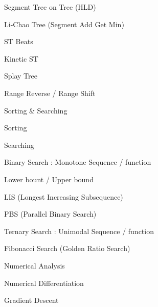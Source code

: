\documentclass[portrait, 8pt, a4paper, oneside, twocolumn]{extarticle}
\begin{document}
\begin{tcolorbox}[breakable, enhanced, sharp corners, colback=white, colframe=black, boxrule=1pt, left=0pt]
\begin{IdeaNote}
\begin{IdeaNote}
\begin{IdeaNote}
\begin{IdeaNote}
            \item Segment Tree on Tree (HLD)
            \item Li-Chao Tree (Segment Add Get Min)
            \item ST Beats
            \item Kinetic ST
            \end{IdeaNote}
        \item Splay Tree
            \begin{IdeaNote}
            \item Range Reverse / Range Shift
            \end{IdeaNote}
        \end{IdeaNote}
    \end{IdeaNote}

\item Sorting \& Searching
    \begin{IdeaNote}
    \item Sorting
    \item Searching
        \begin{IdeaNote}
        \item Binary Search : Monotone Sequence / function
            \begin{IdeaNote}
            \item Lower bount / Upper bound
            \item LIS (Longest Increasing Subsequence)
            \item PBS (Parallel Binary Search)
            \end{IdeaNote}
        \item Ternary Search : Unimodal Sequence / function
            \begin{IdeaNote}
            \item Fibonacci Search (Golden Ratio Search)
            \end{IdeaNote}
        \end{IdeaNote}
    \end{IdeaNote}

\item Numerical Analysis
    \begin{IdeaNote}
    \item Numerical Differentiation
    \item Gradient Descent
    \end{IdeaNote}


\end{IdeaNote}
\end{tcolorbox}
\end{document}

